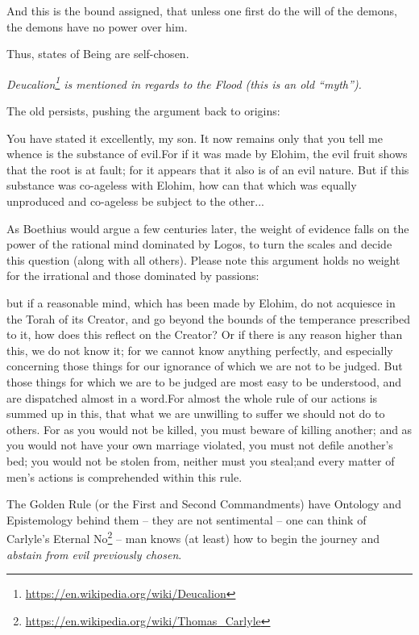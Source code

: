 \begin{quotex}
And this is the bound assigned, that unless one first do the will of the demons, the demons have no power over him.
\end{quotex}


Thus, states of Being are self-chosen.

\emph{Deucalion\footnote{\url{https://en.wikipedia.org/wiki/Deucalion}} is mentioned in regards to the Flood (this is an old ``myth'').}

The old persists, pushing the argument back to origins:

\begin{quotex}
You have stated it excellently, my son. It now remains only that you tell me whence is the substance of evil.For if it was made by Elohim, the evil fruit shows that the root is at fault; for it appears that it also is of an evil nature. But if this substance was co-ageless with Elohim, how can that which was equally unproduced and co-ageless be subject to the other... 
\end{quotex}


As Boethius would argue a few centuries later, the weight of evidence falls on the power of the rational mind dominated by Logos, to turn the scales and decide this question (along with all others). Please note this argument holds no weight for the irrational and those dominated by passions:

\begin{quotex}
but if a reasonable mind, which has been made by Elohim, do not acquiesce in the Torah of its Creator, and go beyond the bounds of the temperance prescribed to it, how does this reflect on the Creator? Or if there is any reason higher than this, we do not know it; for we cannot know anything perfectly, and especially concerning those things for our ignorance of which we are not to be judged. But those things for which we are to be judged are most easy to be understood, and are dispatched almost in a word.For almost the whole rule of our actions is summed up in this, that what we are unwilling to suffer we should not do to others. For as you would not be killed, you must beware of killing another; and as you would not have your own marriage violated, you must not defile another's bed; you would not be stolen from, neither must you steal;and every matter of men's actions is comprehended within this rule.
\end{quotex}


The Golden Rule (or the First and Second Commandments) have Ontology and Epistemology behind them -- they are not sentimental -- one can think of Carlyle's Eternal No\footnote{\url{https://en.wikipedia.org/wiki/Thomas\_Carlyle}} -- man knows (at least) how to begin the journey and \emph{abstain from evil previously chosen}.

